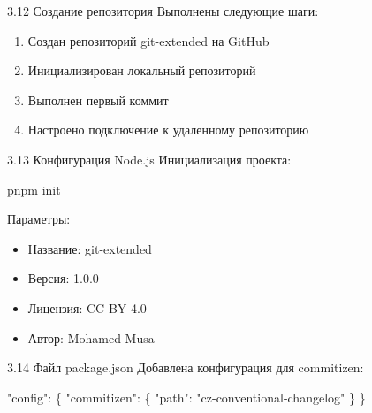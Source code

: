 \documentclass[
  ignorenonframetext,
  aspectratio=169,
  russian,
]{beamer}
\newenvironment{Shaded}{\begin{snugshade}}{\end{snugshade}}
\newcommand{\DataTypeTok}[1]{\textcolor[rgb]{0.68,0.00,0.00}{#1}}
\newcommand{\ErrorTok}[1]{\textcolor[rgb]{0.68,0.00,0.00}{#1}}
\newcommand{\ExtensionTok}[1]{\textcolor[rgb]{0.00,0.23,0.31}{#1}}
\newcommand{\FunctionTok}[1]{\textcolor[rgb]{0.28,0.35,0.67}{#1}}
\newcommand{\NormalTok}[1]{\textcolor[rgb]{0.00,0.23,0.31}{#1}}
\newcommand{\StringTok}[1]{\textcolor[rgb]{0.13,0.47,0.30}{#1}}
\providecommand{\tightlist}{%
  \setlength{\itemsep}{0pt}\setlength{\parskip}{0pt}}
\begin{document}
\begin{frame}{3.12 Создание репозитория}
\label{ux441ux43eux437ux434ux430ux43dux438ux435-ux440ux435ux43fux43eux437ux438ux442ux43eux440ux438ux44f}
Выполнены следующие шаги:

\begin{enumerate}[<+->]
\tightlist
\item
  Создан репозиторий git-extended на GitHub
\item
  Инициализирован локальный репозиторий
\item
  Выполнен первый коммит
\item
  Настроено подключение к удаленному репозиторию
\end{enumerate}
\end{frame}

\begin{frame}[fragile]{3.13 Конфигурация Node.js}
\label{ux43aux43eux43dux444ux438ux433ux443ux440ux430ux446ux438ux44f-node.js}
Инициализация проекта:

\begin{Shaded}
\begin{Highlighting}[]
\ExtensionTok{pnpm}\NormalTok{ init}
\end{Highlighting}
\end{Shaded}

Параметры:

\begin{itemize}[<+->]
\tightlist
\item
  Название: git-extended
\item
  Версия: 1.0.0
\item
  Лицензия: CC-BY-4.0
\item
  Автор: Mohamed Musa
\end{itemize}
\end{frame}

\begin{frame}[fragile]{3.14 Файл package.json}
\label{ux444ux430ux439ux43b-package.json}
Добавлена конфигурация для commitizen:

\begin{Shaded}
\begin{Highlighting}[]
\ErrorTok{"config":} \FunctionTok{\{}
    \DataTypeTok{"commitizen"}\FunctionTok{:} \FunctionTok{\{}
        \DataTypeTok{"path"}\FunctionTok{:} \StringTok{"cz{-}conventional{-}changelog"}
    \FunctionTok{\}}
\FunctionTok{\}}
\end{Highlighting}
\end{Shaded}
\end{frame}
\end{document}
